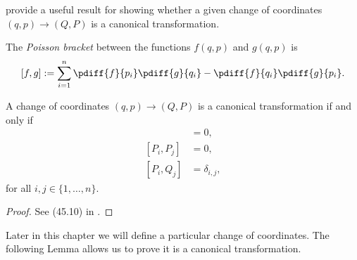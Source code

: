 \citet{landau_mechanics} provide a useful result for showing whether a given
change of coordinates \((q,p) \to (Q,P)\) is a canonical transformation.
\begin{defn}
    The \textit{Poisson bracket} between the functions \(f(q,p)\) and \(g(q,p)\)
    is
    \begin{equation}\label{eqn:poisson-bracket}
        [f,g] := \sum \limits_{i=1}^n \pdiff{f}{p_i}\pdiff{g}{q_i} - 
            \pdiff{f}{q_i}\pdiff{g}{p_i}
        .
    \end{equation}
\end{defn}
\begin{thm}\label{thm:canonical-transformations}
    A change of coordinates 
    \((q,p) \to (Q,P)\) is a canonical transformation if and only if
    \begin{align*}
        [Q_i, Q_j] &= 0
        , \\
        [P_i, P_j] &= 0
        , \\
        [P_i, Q_j] &= \delta_{i,j}
        , 
    \end{align*}
    for all \(i,j \in \{1,\ldots,n\}\).
\end{thm}
\begin{proof}
    See (45.10) in \cite{landau_mechanics}.
\end{proof}

Later in this chapter we will define a particular change of coordinates.
The following Lemma allows us to prove it is a canonical transformation.

